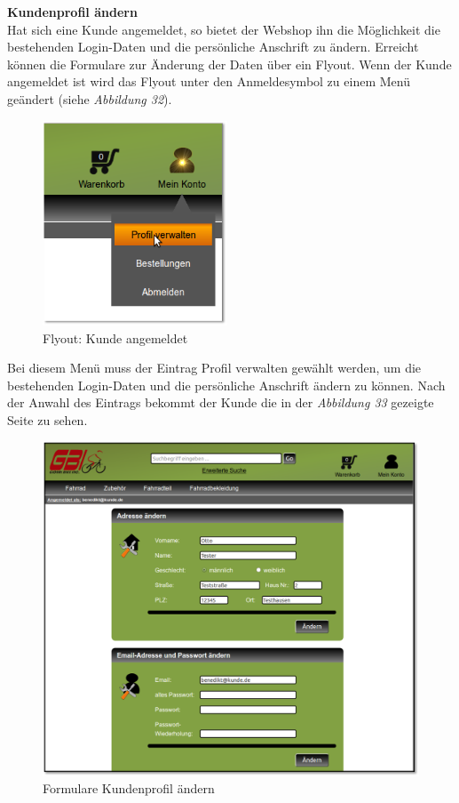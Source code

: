 \textbf{Kundenprofil ändern}\\
Hat sich eine Kunde angemeldet, so bietet der Webshop ihn die Möglichkeit die bestehenden Login-Daten und die persönliche Anschrift zu ändern. Erreicht können die Formulare zur Änderung der Daten über ein Flyout. Wenn der Kunde angemeldet ist wird das Flyout unter den Anmeldesymbol zu einem Menü geändert (siehe \textit{Abbildung 32}).
\begin{figure}[H]
	\begin{center}
			\includegraphics[width=55mm]{Bilder/Abbildung15_Menue_Profil_aendern.png}
	\end{center}
	\caption{Flyout: Kunde angemeldet}
\end{figure}
Bei diesem Menü muss der Eintrag \glqq Profil verwalten\grqq{} gewählt werden, um die bestehenden Login-Daten und die persönliche Anschrift ändern zu können. Nach der Anwahl des Eintrags bekommt der Kunde die in der \textit{Abbildung 33} gezeigte Seite zu sehen.
\begin{figure}[H]
	\begin{center}
			\includegraphics[width=130mm]{Bilder/formulare_profil_aendern.png}
	\end{center}
	\caption{Formulare Kundenprofil ändern}
\end{figure}
